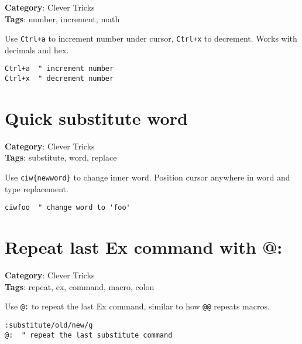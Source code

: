 {{\textbf{Category}: Clever Tricks\\ \textbf{Tags}: number, increment, math
\vspace{0.5cm}

Use {\footnotesize \Verb§Ctrl+a§} to increment number under cursor, {\footnotesize \Verb§Ctrl+x§} to decrement. Works with decimals and hex.

\begin{Exa*}{}
\begin{Verbatim}[fontsize=\footnotesize, breaklines, breakanywhere]
Ctrl+a  " increment number
Ctrl+x  " decrement number
\end{Verbatim}
\end{Exa*}

\section{Quick substitute word}

\textbf{Category}: Clever Tricks\\ \textbf{Tags}: substitute, word, replace
\vspace{0.5cm}

Use {\footnotesize \Verb§ciw{newword}§} to change inner word. Position cursor anywhere in word and type replacement.

\begin{Exa*}{}
\begin{Verbatim}[fontsize=\footnotesize, breaklines, breakanywhere]
ciwfoo  " change word to 'foo'
\end{Verbatim}
\end{Exa*}

\section{Repeat last Ex command with @:}

\textbf{Category}: Clever Tricks\\ \textbf{Tags}: repeat, ex, command, macro, colon
\vspace{0.5cm}

Use {\footnotesize \Verb§@:§} to repeat the last Ex command, similar to how {\footnotesize \Verb§@@§} repeats macros.

\begin{Exa*}{}
\begin{Verbatim}[fontsize=\footnotesize, breaklines, breakanywhere]
:substitute/old/new/g
@:  " repeat the last substitute command
\end{Verbatim}
\end{Exa*}

}}
